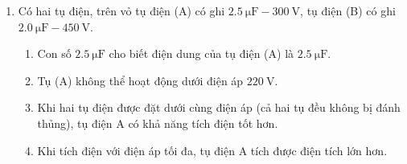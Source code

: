 \begin{enumerate}[label=\bfseries Câu \arabic*:]
	\item Có hai tụ điện, trên vỏ tụ điện (A) có ghi $\SI{2.5}{\micro\farad}-\SI{300}{\volt}$, tụ điện (B) có ghi $\SI{2.0}{\micro\farad}-\SI{450}{\volt}$.
	\begin{enumerate}[label=\alph*)]
		\item Con số $\SI{2.5}{\micro\farad}$ cho biết điện dung của tụ điện (A) là $\SI{2.5}{\micro\farad}$.
		\item Tụ (A) không thể hoạt động dưới điện áp $\SI{220}{\volt}$.
		\item Khi hai tụ điện được đặt dưới cùng điện áp (cả hai tụ đều không bị đánh thủng), tụ điện A có khả năng tích điện tốt hơn.
		\item Khi tích điện với điện áp tối đa, tụ điện A tích được điện tích lớn hơn.
	\end{enumerate}


\end{enumerate}
